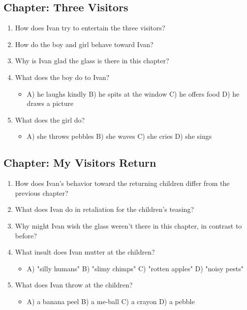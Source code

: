 \documentclass[11pt]{article}
\begin{document}
\subsection*{Chapter: Three Visitors}
\begin{enumerate}
  \item How does Ivan try to entertain the three visitors?
  \vspace{0.5in}
  \item How do the boy and girl behave toward Ivan?
  \vspace{0.5in}
  \item Why is Ivan glad the glass is there in this chapter?
  \vspace{0.5in}
  \item What does the boy do to Ivan?
  \begin{itemize}\setlength\itemsep{0pt}
    \item[] A) he laughs kindly \quad B) he spits at the window \quad C) he offers food \quad D) he draws a picture
  \end{itemize}
  \item What does the girl do?
  \begin{itemize}\setlength\itemsep{0pt}
    \item[] A) she throws pebbles \quad B) she waves \quad C) she cries \quad D) she sings
  \end{itemize}
\end{enumerate}

\subsection*{Chapter: My Visitors Return}
\begin{enumerate}
  \item How does Ivan's behavior toward the returning children differ from the previous chapter?
  \vspace{0.5in}
  \item What does Ivan do in retaliation for the children's teasing?
  \vspace{0.5in}
  \item Why might Ivan wish the glass weren't there in this chapter, in contrast to before?
  \vspace{0.5in}
  \item What insult does Ivan mutter at the children?
  \begin{itemize}\setlength\itemsep{0pt}
    \item[] A) "silly humans" \quad B) "slimy chimps" \quad C) "rotten apples" \quad D) "noisy pests"
  \end{itemize}
  \item What does Ivan throw at the children?
  \begin{itemize}\setlength\itemsep{0pt}
    \item[] A) a banana peel \quad B) a me-ball \quad C) a crayon \quad D) a pebble
  \end{itemize}
\end{enumerate}
\end{document}
